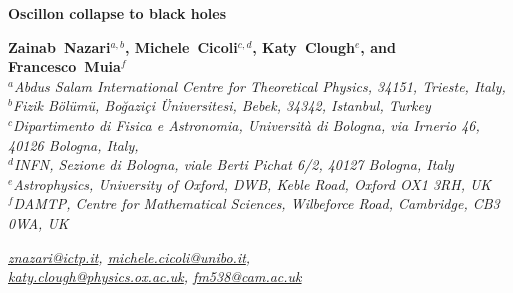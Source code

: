 \documentclass[11pt,a4paper]{article}
\begin{document}

\vspace*{1.3cm}
\vskip 1.5cm

\begin{center}

\bigskip
{\huge\bf  Oscillon collapse to black holes}

\vskip 1.2cm

{\large \bf
Zainab~Nazari$^{a,b}$,
 Michele~Cicoli$^{c,d}$,
 Katy~Clough$^e$, and
Francesco~Muia$^f$}\\[8mm]

{\it{
$^{a}${Abdus Salam International Centre for Theoretical Physics, 34151, Trieste, Italy}, \\
$^{b}${Fizik B\"{o}l\"{u}m\"{u}, Bo\u{g}azi\c{c}i  \"{U}niversitesi,  Bebek, 34342, Istanbul, Turkey} \\
$^c${Dipartimento di Fisica e Astronomia, Universit\`a di Bologna, via Irnerio 46, 40126 Bologna, Italy}, \\
$^d${INFN, Sezione di Bologna, viale Berti Pichat 6/2, 40127 Bologna, Italy} \\
$^e${Astrophysics, University of Oxford, DWB, Keble Road, Oxford OX1 3RH, UK} \\
$^f${DAMTP, Centre for Mathematical Sciences, Wilbeforce Road, Cambridge, CB3 0WA, UK}}}

\vskip 0.6cm

\it{\href{mailto:znazari@ictp.it}{znazari@ictp.it}, \href{mailto:michele.cicoli@unibo.it}{michele.cicoli@unibo.it},\\ \href{mailto:katy.clough@physics.ox.ac.uk}{katy.clough@physics.ox.ac.uk}, \href{mailto:fm538@damtp.cam.ac.uk}{fm538@cam.ac.uk}}

\vskip 1.0cm

\end{center}

\end{document}
